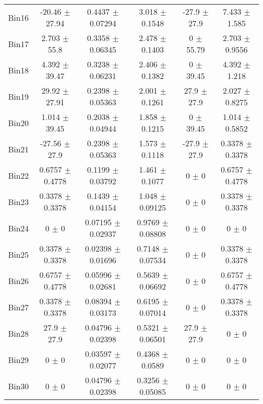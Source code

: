 \begin{tabular}{@{\extracolsep{4pt}}lccccc@{}}
     Bin16 & -20.46 $\pm$ 27.94 & 0.4437 $\pm$ 0.07294 & 3.018 $\pm$ 0.1548 & -27.9 $\pm$ 27.9 & 7.433 $\pm$ 1.585 \\ 
     Bin17 & 2.703 $\pm$ 55.8 & 0.3358 $\pm$ 0.06345 & 2.478 $\pm$ 0.1403 & 0 $\pm$ 55.79 & 2.703 $\pm$ 0.9556 \\ 
     Bin18 & 4.392 $\pm$ 39.47 & 0.3238 $\pm$ 0.06231 & 2.406 $\pm$ 0.1382 & 0 $\pm$ 39.45 & 4.392 $\pm$ 1.218 \\ 
     Bin19 & 29.92 $\pm$ 27.91 & 0.2398 $\pm$ 0.05363 & 2.001 $\pm$ 0.1261 & 27.9 $\pm$ 27.9 & 2.027 $\pm$ 0.8275 \\ 
     Bin20 & 1.014 $\pm$ 39.45 & 0.2038 $\pm$ 0.04944 & 1.858 $\pm$ 0.1215 & 0 $\pm$ 39.45 & 1.014 $\pm$ 0.5852 \\ 
     Bin21 & -27.56 $\pm$ 27.9 & 0.2398 $\pm$ 0.05363 & 1.573 $\pm$ 0.1118 & -27.9 $\pm$ 27.9 & 0.3378 $\pm$ 0.3378 \\ 
     Bin22 & 0.6757 $\pm$ 0.4778 & 0.1199 $\pm$ 0.03792 & 1.461 $\pm$ 0.1077 & 0 $\pm$ 0 & 0.6757 $\pm$ 0.4778 \\ 
     Bin23 & 0.3378 $\pm$ 0.3378 & 0.1439 $\pm$ 0.04154 & 1.048 $\pm$ 0.09125 & 0 $\pm$ 0 & 0.3378 $\pm$ 0.3378 \\ 
     Bin24 & 0 $\pm$ 0 & 0.07195 $\pm$ 0.02937 & 0.9769 $\pm$ 0.08808 & 0 $\pm$ 0 & 0 $\pm$ 0 \\ 
     Bin25 & 0.3378 $\pm$ 0.3378 & 0.02398 $\pm$ 0.01696 & 0.7148 $\pm$ 0.07534 & 0 $\pm$ 0 & 0.3378 $\pm$ 0.3378 \\ 
     Bin26 & 0.6757 $\pm$ 0.4778 & 0.05996 $\pm$ 0.02681 & 0.5639 $\pm$ 0.06692 & 0 $\pm$ 0 & 0.6757 $\pm$ 0.4778 \\ 
     Bin27 & 0.3378 $\pm$ 0.3378 & 0.08394 $\pm$ 0.03173 & 0.6195 $\pm$ 0.07014 & 0 $\pm$ 0 & 0.3378 $\pm$ 0.3378 \\ 
     Bin28 & 27.9 $\pm$ 27.9 & 0.04796 $\pm$ 0.02398 & 0.5321 $\pm$ 0.06501 & 27.9 $\pm$ 27.9 & 0 $\pm$ 0 \\ 
     Bin29 & 0 $\pm$ 0 & 0.03597 $\pm$ 0.02077 & 0.4368 $\pm$ 0.0589 & 0 $\pm$ 0 & 0 $\pm$ 0 \\ 
     Bin30 & 0 $\pm$ 0 & 0.04796 $\pm$ 0.02398 & 0.3256 $\pm$ 0.05085 & 0 $\pm$ 0 & 0 $\pm$ 0 \\ 
\hline\hline
  \end{tabular}
